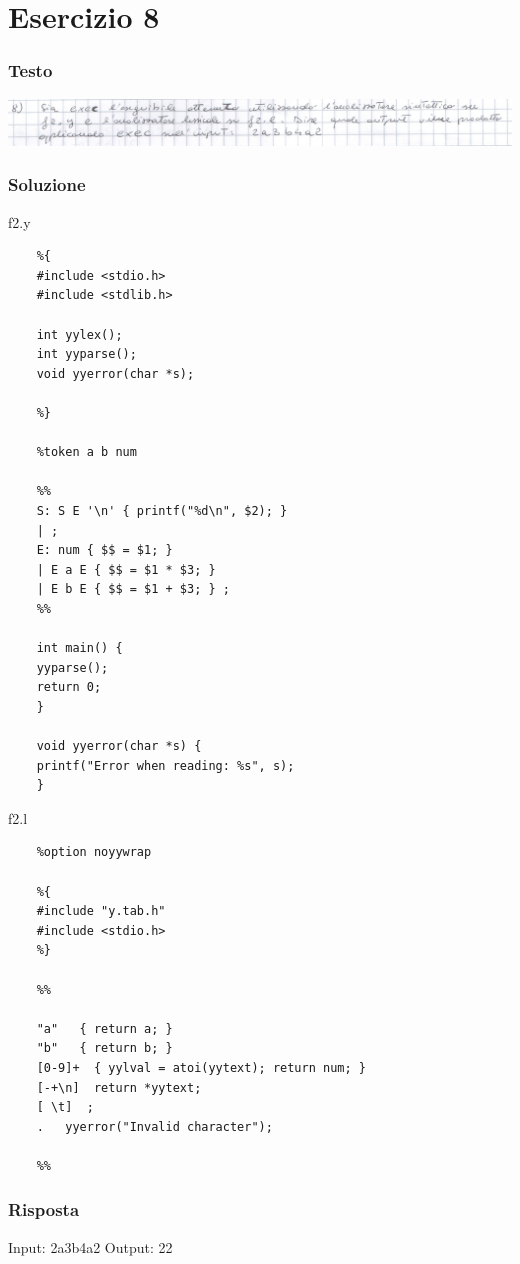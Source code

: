 \chapter{Esercizio 8}

\subsection{Testo}

\begin{center}
    \includegraphics[scale=0.2]{Chapters/Img/08text.png}\\
\end{center} 

\subsection{Soluzione}
f2.y
\begin{lstlisting}
    %{
    #include <stdio.h>
    #include <stdlib.h>
    
    int yylex();
    int yyparse();
    void yyerror(char *s);

    %}

    %token a b num

    %%
    S: S E '\n' { printf("%d\n", $2); }
    | ;
    E: num { $$ = $1; }
    | E a E { $$ = $1 * $3; }
    | E b E { $$ = $1 + $3; } ;
    %%

    int main() {
    yyparse();
    return 0;
    }

    void yyerror(char *s) {
    printf("Error when reading: %s", s);
    }
\end{lstlisting}

f2.l
\begin{lstlisting}
    %option noyywrap

    %{
    #include "y.tab.h"
    #include <stdio.h>
    %}

    %%

    "a"   { return a; }
    "b"   { return b; }
    [0-9]+  { yylval = atoi(yytext); return num; }
    [-+\n]  return *yytext;
    [ \t]  ;
    .   yyerror("Invalid character");

    %%
\end{lstlisting}

\subsection{Risposta}
Input: 2a3b4a2
Output: 22